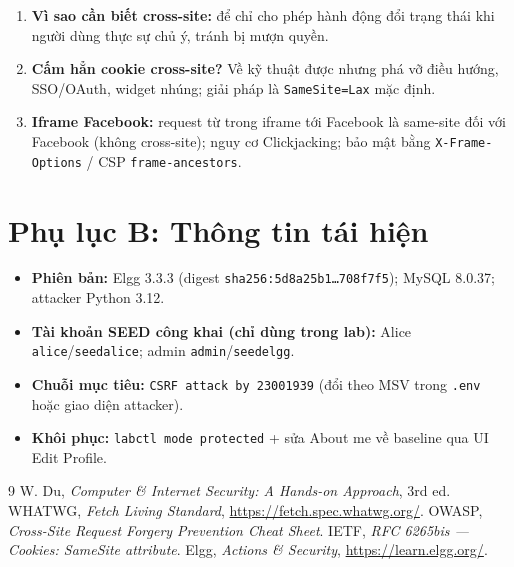 \documentclass[11pt,a4paper]{article}
\begin{document}
\begin{enumerate}[leftmargin=2.2em]
\item \textbf{Vì sao cần biết cross-site:} để chỉ cho phép hành động đổi trạng thái khi người dùng thực sự chủ ý, tránh bị mượn quyền.
\item \textbf{Cấm hẳn cookie cross-site?} Về kỹ thuật được nhưng phá vỡ điều hướng, SSO/OAuth, widget nhúng; giải pháp là \texttt{SameSite=Lax} mặc định.
\item \textbf{Iframe Facebook:} request từ trong iframe tới Facebook là same-site đối với Facebook (không cross-site); nguy cơ Clickjacking; bảo mật bằng \texttt{X-Frame-Options} / CSP \texttt{frame-ancestors}.
\end{enumerate}

\section{Phụ lục B: Thông tin tái hiện}
\small
\begin{itemize}
  \item \textbf{Phiên bản:} Elgg 3.3.3 (digest \texttt{sha256:5d8a25b1\ldots708f7f5}); MySQL 8.0.37; attacker Python 3.12.
  \item \textbf{Tài khoản SEED công khai (chỉ dùng trong lab):} Alice \texttt{alice}/\texttt{seedalice}; admin \texttt{admin}/\texttt{seedelgg}.
  \item \textbf{Chuỗi mục tiêu:} \texttt{CSRF attack by 23001939} (đổi theo MSV trong \texttt{.env} hoặc giao diện attacker).
  \item \textbf{Khôi phục:} \texttt{labctl mode protected} + sửa About me về baseline qua UI Edit Profile.
\end{itemize}

\begin{thebibliography}{9}\small
{} W. Du, \emph{Computer \& Internet Security: A Hands-on Approach}, 3rd ed.
 WHATWG, \emph{Fetch Living Standard}, \url{https://fetch.spec.whatwg.org/}.
 OWASP, \emph{Cross-Site Request Forgery Prevention Cheat Sheet}.
 IETF, \emph{RFC 6265bis — Cookies: SameSite attribute}.
 Elgg, \emph{Actions \& Security}, \url{https://learn.elgg.org/}.
\end{thebibliography}
\end{document}
